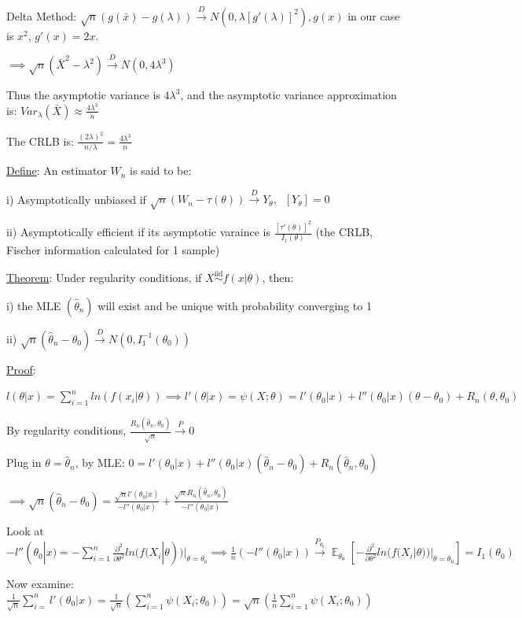 \documentclass{article}
\DeclareMathOperator{\EX}{\mathbb{E}} %
\DeclareMathOperator{\ext}{\EX_{\theta}} %
\newcommand{\pto}{\overset{P}{\to}}
\newcommand{\dto}{\overset{D}{\to}}
\let\Oldsum=\sum
\renewcommand{\sum}{\Oldsum\limits}
\newcommand{\iiddist}{\overset{\mathrm{iid}}{\sim}}
\begin{document}
Delta Method: $\sqrt{n}(g(\bar{x}) - g(\lambda)) \dto N(0, \lambda[g'(\lambda)]^2), g(x)$ in our case is $x^2$, $g'(x) = 2x$.

$\implies \sqrt{n}(\bar{X}^2 - \lambda^2) \dto N(0, 4\lambda^3)$

Thus the asymptotic variance is $4\lambda^3$, and the asymptotic variance approximation is: $Var_{\lambda}(\bar{X}) \approx \frac{4\lambda^3}{n}$

The CRLB is: $\frac{(2\lambda)^2}{n/\lambda} = \frac{4\lambda^3}{n}$

\underline{Define}: An estimator $W_n$ is said to be:

i) Asymptotically unbiased if $\sqrt{n}(W_n - \tau(\theta)) \dto Y_{\theta}, \ext[Y_{\theta}] = 0$

ii) Asymptotically efficient if its asymptotic varaince is $\frac{[\tau'(\theta)]^2}{I_1(\theta)}$ (the CRLB, Fischer information calculated for 1 sample)

\underline{Theorem}: Under regularity conditions, if $X \iiddist f(x|\theta)$, then:

i) the MLE $(\hat{\theta}_n)$ will exist and be unique with probability converging to 1

ii) $\sqrt{n}(\hat{\theta}_n - \theta_0) \dto N(0, I_1^{-1}(\theta_0))$

\underline{Proof}: 

$l(\theta|x) = \sum_{i=1}^n ln(f(x_i|\theta)) \implies l'(\theta|x) = \psi(X; \theta) = l'(\theta_0|x) + l''(\theta_0|x)(\theta - \theta_0) + R_n(\theta, \theta_0)$

By regularity conditions, $\frac{R_n(\hat{\theta}_n, \theta_0)}{\sqrt{n}} \pto 0$

Plug in $\theta = \hat{\theta}_n$, by MLE: $0 = l'(\theta_0|x) + l''(\theta_0|x)(\hat{\theta}_n - \theta_0) + R_n(\hat{\theta}_n, \theta_0)$

$\implies \sqrt{n}(\hat{\theta}_n - \theta_0) = \frac{\sqrt{n}l'(\theta_0|x)}{-l''(\theta_0|x)} + \frac{\sqrt{n}R_n(\hat{\theta}_n, \theta_0)}{-l''(\theta_0|x)}$

Look at $-l''(\theta_0|x) = -\sum_{i=1}^n \frac{\partial^2}{\partial \theta^2}ln(f(X_i|\theta))|_{\theta = \theta_0} \implies \frac{1}{n}(-l''(\theta_0|x)) \overset{P_{\theta_0}}{\to} \EX_{\theta_0}[-\frac{\partial^2}{\partial \theta^2}ln(f(X_i|\theta))|_{\theta = \theta_0}] = I_1(\theta_0)$

Now examine: $\frac{1}{\sqrt{n}} \sum_{i=}^n l'(\theta_0|x) = \frac{1}{\sqrt{n}}(\sum_{i=1}^n \psi(X_i; \theta_0)) = \sqrt{n}(\frac{1}{n}\sum_{i=1}^n \psi(X_i; \theta_0))$
\end{document}
